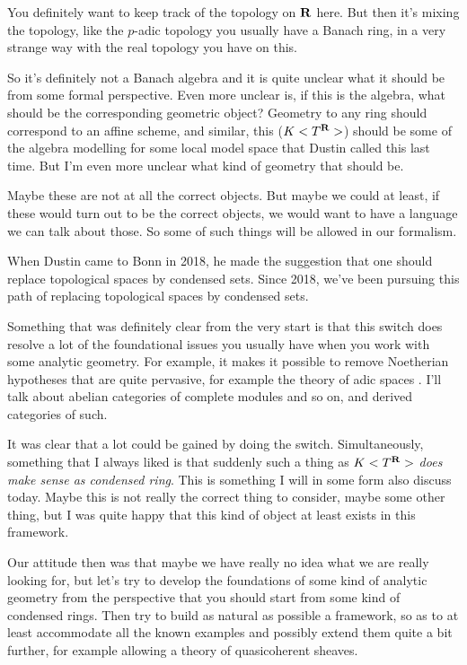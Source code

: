 You definitely want to keep track of the topology on $\mathbf R$ here. But then it's mixing the topology, like the $p$-adic topology you usually have a Banach ring, in a very strange way with the real topology you have on this. 

So it's definitely not a Banach algebra and it is quite unclear what it should be from some formal perspective.
Even more unclear is, if this is the algebra, what should be the corresponding geometric object? Geometry to any ring should correspond to an affine scheme, and similar, this ($K<T^{\mathbf R}>$) should be some of the algebra modelling for some local model space that Dustin called this last time. 
But I'm even more unclear what kind of geometry that should be.

Maybe these are not at all the correct objects. But maybe we could at least, if these would turn out to be the correct objects, we would want to have a language we can talk about those. So some of such things will be allowed in our formalism.

When Dustin came to Bonn in 2018, he made the suggestion that one should replace topological spaces by condensed sets. Since 2018, we've been pursuing this path of replacing topological spaces by condensed sets.

Something that was definitely clear from the very start is that this switch does resolve a lot of the foundational issues you usually have when you work with some analytic geometry. For example, it makes it possible to remove Noetherian hypotheses that are quite pervasive, for example the theory of adic spaces . I'll talk about abelian categories of complete modules and so on, and derived categories of such.

It was clear that a lot could be gained by doing the switch. Simultaneously, something that I always liked is that suddenly such a thing as \emph{$K<T^{\mathbf R}>$ does make sense as condensed ring}. This is something I will in some form also discuss today. Maybe this is not really the correct thing to consider, maybe some other thing, but I was quite happy that this kind of object at least exists in this framework.

Our attitude then was that maybe we have really no idea what we are really looking for, but let's try to develop the foundations of some kind of analytic geometry from the perspective that you should start from some kind of condensed rings. Then try to build as natural as possible a framework, so as to at least accommodate all the known examples and possibly extend them quite a bit further, for example allowing a theory of quasicoherent sheaves.


